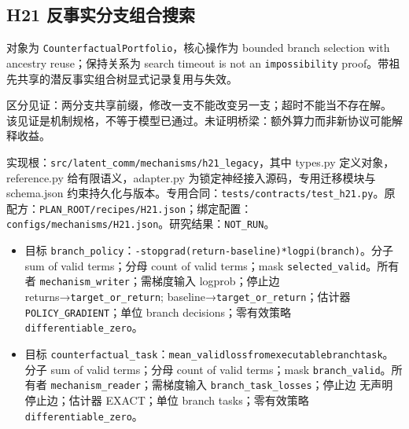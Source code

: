 \documentclass[
  10pt,
]{article}
\begin{document}
\subsection{H21
反事实分支组合搜索}\label{h21-ux53cdux4e8bux5b9eux5206ux652fux7ec4ux5408ux641cux7d22}

对象为 \nolinkurl{CounterfactualPortfolio}，核心操作为 bounded branch
selection with ancestry reuse；保持关系为 search timeout is not an
\nolinkurl{impossibility}
proof。带祖先共享的潜反事实组合树显式记录复用与失效。

区分见证：两分支共享前缀，修改一支不能改变另一支；超时不能当不存在解。
该见证是机制规格，不等于模型已通过。未证明桥梁：额外算力而非新协议可能解释收益。

实现根：{\small\nolinkurl{src/latent_comm/mechanisms/h21_legacy}}，其中
types.py 定义对象，reference.py 给有限语义，adapter.py
为锁定神经接入源码，专用迁移模块与 schema.json
约束持久化与版本。专用合同：{\small\nolinkurl{tests/contracts/test_h21.py}}。原配方：{\small\nolinkurl{PLAN_ROOT/recipes/H21.json}}；绑定配置：{\small\nolinkurl{configs/mechanisms/H21.json}}。研究结果：\nolinkurl{NOT_RUN}。

\begin{itemize}
\item
  目标
  \nolinkurl{branch_policy}：{\small\nolinkurl{-stopgrad(return-baseline)*log}\hspace{0.333em}\nolinkurl{pi(branch)}}。分子
  sum of valid terms；分母 count of valid terms；mask
  \nolinkurl{selected_valid}。所有者
  \nolinkurl{mechanism_writer}；需梯度输入 logprob；停止边
  returns→\nolinkurl{target_or_return};
  baseline→\nolinkurl{target_or_return}；估计器
  \nolinkurl{POLICY_GRADIENT}；单位 branch decisions；零有效策略
  \nolinkurl{differentiable_zero}。
\item
  目标
  \nolinkurl{counterfactual_task}：{\small\nolinkurl{mean_valid}\hspace{0.333em}\nolinkurl{loss}\hspace{0.333em}\nolinkurl{from}\hspace{0.333em}\nolinkurl{executable}\hspace{0.333em}\nolinkurl{branch}\hspace{0.333em}\nolinkurl{task}}。分子
  sum of valid terms；分母 count of valid terms；mask
  \nolinkurl{branch_valid}。所有者
  \nolinkurl{mechanism_reader}；需梯度输入
  \nolinkurl{branch_task_losses}；停止边 无声明停止边；估计器
  EXACT；单位 branch tasks；零有效策略 \nolinkurl{differentiable_zero}。
\end{itemize}
\end{document}
